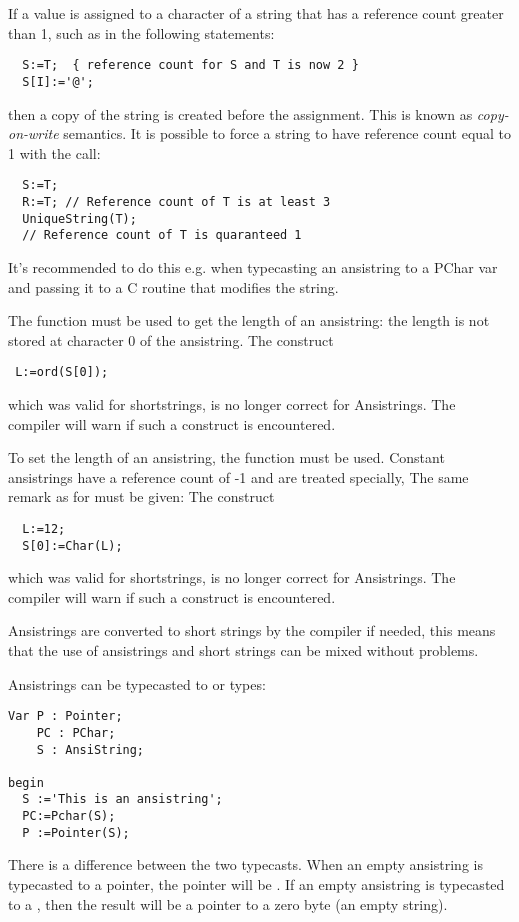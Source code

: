 If a value is assigned to a character of a string that has a reference count
greater than 1, such as in the following
statements:
\begin{verbatim}
  S:=T;  { reference count for S and T is now 2 }
  S[I]:='@';
\end{verbatim}
then a copy of the string is created before the assignment. This is known
as {\em copy-on-write} semantics. It is possible to force a string to have
reference count equal to 1 with the  call:
\begin{verbatim}
  S:=T;
  R:=T; // Reference count of T is at least 3
  UniqueString(T); 
  // Reference count of T is quaranteed 1
\end{verbatim}
It's recommended to do this e.g. when typecasting an ansistring to a PChar var
and passing it to a C routine that modifies the string.

The  function must be used to get the length of an
ansistring: the length is not stored at character 0 of the ansistring. 
The construct
\begin{verbatim}
 L:=ord(S[0]);
\end{verbatim}
which was valid for \tp shortstrings, is no longer correct for
Ansistrings. The compiler will warn if such a construct is encountered.


To set the length of an ansistring, the  function must be used.
Constant ansistrings have a reference count of -1 and are treated specially,
The same remark as for  must be given: The construct
\begin{verbatim}
  L:=12;
  S[0]:=Char(L);
\end{verbatim}
which was valid for \tp shortstrings, is no longer correct for
Ansistrings. The compiler will warn if such a construct is encountered.

Ansistrings are converted to short strings by the compiler if needed,
this means that the use of ansistrings and short strings can be mixed
without problems.

Ansistrings can be typecasted to  or  types:
\begin{verbatim}
Var P : Pointer;
    PC : PChar;
    S : AnsiString;

begin
  S :='This is an ansistring';
  PC:=Pchar(S);
  P :=Pointer(S);
\end{verbatim}
There is a difference between the two typecasts. When an empty
ansistring is typecasted to a pointer, the pointer will be . If an
empty ansistring is typecasted to a , then the result will be a pointer to a
zero byte (an empty string).

